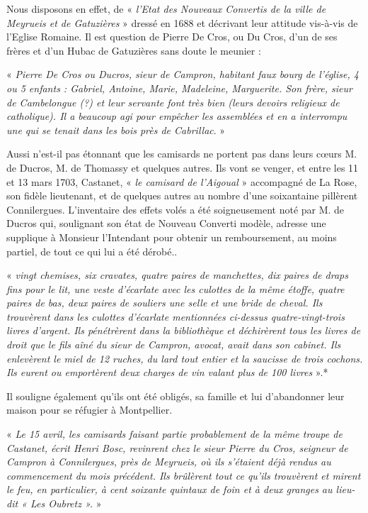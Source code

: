 \vspace{0.2cm}

Nous disposons en effet, de « \textit{l’Etat des Nouveaux Convertis de la ville de Meyrueis et de
Gatuzières} » dressé en 1688 et décrivant leur attitude vis-à-vis de l’Eglise Romaine. Il est
question de Pierre De Cros, ou Du Cros, d’un de ses frères et d’un Hubac de Gatuzières sans
doute le meunier :

« \textit{Pierre De Cros ou Ducros, sieur de Campron, habitant faux bourg de l’église, 4 ou 5
enfants : Gabriel, Antoine, Marie, Madeleine, Marguerite. Son frère, sieur de Cambelongue
(?) et leur servante font très bien (leurs devoirs religieux de catholique). Il a beaucoup agi
pour empêcher les assemblées et en a interrompu une qui se tenait dans les bois près de
Cabrillac}. »

\vspace{0.3cm}

Aussi n’est-il pas étonnant que les camisards ne portent pas dans leurs cœurs M. de Ducros,
M. de Thomassy et quelques autres. Ils vont se venger, et entre les 11 et 13 mars 1703,
Castanet, « \textit{le camisard de l’Aigoual} » accompagné de La Rose, son fidèle lieutenant, et de
quelques autres au nombre d’une soixantaine pillèrent Connilergues. L’inventaire des effets
volés a été soigneusement noté par M. de Ducros qui, soulignant son état de Nouveau
Converti modèle, adresse une supplique à Monsieur l’Intendant pour obtenir un
remboursement, au moins partiel, de tout ce qui lui a été dérobé..

« \textit{vingt chemises, six cravates, quatre paires de manchettes, dix paires de draps fins pour le lit,
une veste d’écarlate avec les culottes de la même étoffe, quatre paires de bas, deux paires de
souliers une selle et une bride de cheval. Ils trouvèrent dans les culottes d’écarlate
mentionnées ci-dessus quatre-vingt-trois livres d’argent. Ils pénétrèrent dans la bibliothèque
et déchirèrent tous les livres de droit que le fils aîné du sieur de Campron, avocat, avait dans
son cabinet. Ils enlevèrent le miel de 12 ruches, du lard tout entier et la saucisse de trois
cochons. Ils eurent ou emportèrent deux charges de vin valant plus de 100 livres} ».*

Il souligne également qu’ils ont été obligés, sa famille et lui d’abandonner leur maison pour
se réfugier à Montpellier.

\vspace{0.2cm}

« \textit{Le 15 avril, les camisards faisant partie probablement de la même troupe de Castanet, écrit
Henri Bosc, revinrent chez le sieur Pierre du Cros, seigneur de Campron à Connilergues,
près de Meyrueis, où ils s’étaient déjà rendus au commencement du mois précédent. Ils
brûlèrent tout ce qu’ils trouvèrent et mirent le feu, en particulier, à cent soixante quintaux de
foin et à deux granges au lieu-dit « Les Oubretz ».} »

